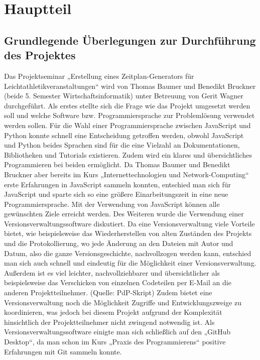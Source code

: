 
\chapter{Hauptteil}
\label{chap:Hauptteil}

\section{Grundlegende Überlegungen zur Durchführung des Projektes}
Das Projektseminar „Erstellung eines Zeitplan-Generators für Leichtathletikveranstaltungen“ wird von Thomas Baumer und Benedikt Bruckner (beide 5. Semester Wirtschaftsinformatik) unter Betreuung von Gerit Wagner durchgeführt. Als erstes stellte sich die Frage wie das Projekt umgesetzt werden soll und welche Software bzw. Programmiersprache zur Problemlösung verwendet werden sollen. 
Für die Wahl einer Programmiersprache zwischen JavaScript und Python konnte schnell eine Entscheidung getroffen werden, obwohl JavaScript und Python beides Sprachen sind für die eine Vielzahl an Dokumentationen, Bibliotheken und Tutorials existieren. Zudem wird ein klares und übersichtliches Programmieren bei beiden ermöglicht. Da Thomas Baumer und Benedikt Bruckner aber bereits im Kurs „Internettechnologien und Network-Computing“ erste Erfahrungen in JavaScript sammeln konnten, entschied man sich für JavaScript und sparte sich so eine größere Einarbeitungszeit in eine neue Programmiersprache. Mit der Verwendung von JavaScript können alle gewünschten Ziele erreicht werden.
Des Weiteren wurde die Verwendung einer Versionsverwaltungssoftware diskutiert. Da eine Versionsverwaltung viele Vorteile bietet, wie beispielsweise das Wiederherstellen von alten Zuständen des Projekts und die Protokollierung, wo jede Änderung an den Dateien mit Autor und Datum, also die ganze Versionsgeschichte, nachvollzogen werden kann, entschied man sich auch schnell und eindeutig für die Möglichkeit einer Versionsverwaltung. Außerdem ist es viel leichter, nachvollziehbarer und übersichtlicher als beispielsweise das Verschicken von einzelnen Codeteilen per E-Mail an die anderen Projektteilnehmer. (Quelle: PdP-Skript) Zudem bietet eine Versionsverwaltung noch die Möglichkeit Zugriffe und Entwicklungszweige zu koordinieren, was jedoch bei diesem Projekt aufgrund der Komplexität hinsichtlich der Projektteilnehmer nicht zwingend notwendig ist. Als Versionsverwaltungssoftware einigte man sich schließlich auf den „GitHub Desktop“, da man schon im Kurs „Praxis des Programmierens“ positive Erfahrungen mit Git sammeln konnte. 
